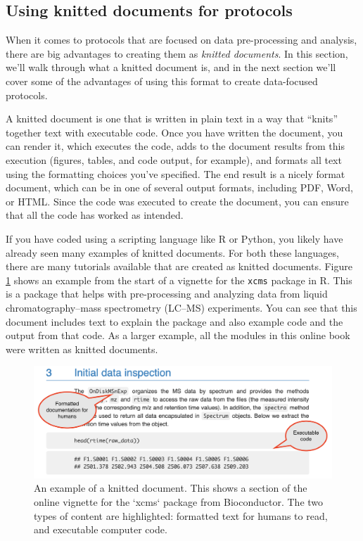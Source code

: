 \documentclass[]{tufte-book}
\begin{document}
\subsection{Using knitted documents for protocols}\label{using-knitted-documents-for-protocols}

When it comes to protocols that are focused on data pre-processing and
analysis, there are big advantages to creating them as
\emph{knitted documents}. In this section, we'll walk through what a knitted
document is, and in the next section we'll cover some of the advantages of using this format to
create data-focused protocols.

A knitted document is one that is written in plain text in a way that ``knits''
together text with executable code. Once you have written the document, you can
render it, which executes the code, adds to the document results from this
execution (figures, tables, and code output, for example), and formats all text
using the formatting choices you've specified. The end result is a nicely format
document, which can be in one of several output formats, including PDF, Word, or
HTML. Since the code was executed to create the document, you can ensure that
all the code has worked as intended.

If you have coded using a scripting language like R or Python, you likely have
already seen many examples of knitted documents. For both these languages, there
are many tutorials available that are created as knitted documents. Figure
\ref{fig:xcmsexample} shows an example from the start of a vignette for the
\texttt{xcms} package in R. This is a package that helps with pre-processing and
analyzing data from liquid chromatography--mass spectrometry (LC--MS)
experiments. You can see that this document includes text to explain the package
and also example code and the output from that code.
As a larger example, all the modules in this online book were written as knitted
documents.

\begin{figure}
\includegraphics[width=\textwidth]{figures/vignette_example_annotated} \caption[An example of a knitted document]{An example of a knitted document. This shows a section of the online vignette for the `xcms` package from Bioconductor. The two types of content are highlighted: formatted text for humans to read, and executable computer code.}\label{fig:xcmsexample}
\end{figure}
\end{document}
